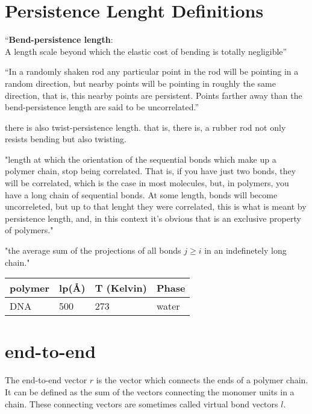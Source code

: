 \section{Persistence Lenght Definitions}

``\textbf{Bend-persistence length}:\\ 
A length scale beyond which the elastic cost of bending is totally
negligible''

``In a randomly shaken rod any particular point in the rod will be
pointing in a random direction, but nearby points will be pointing in
roughly the same direction, that is, this nearby points are
persistent. Points farther away than the bend-persistence length are
said to be uncorrelated.''

there is also twist-persistence length.
that is, there is, a rubber rod not only resists bending but also twisting.

"length at which the orientation of the sequential bonds which make
up a polymer chain, stop being correlated. That is, if you have just
two bonds, they will be correlated, which is the case in most
molecules, but, in polymers, you have a long chain of sequential
bonds. At some length, bonds will become uncorreleted, but up to that
lenght they were correlated, this is what is meant by persistence
length, and, in this context it's obvious that is an exclusive
property of polymers."

"the average sum of the projections of all bonds $ j \geq i$  in an 
indefinetely long chain."


\begin{table}[htbp]
\begin{center}
\begin{tabular}{|l|l|l|l|}
\hline 
polymer & lp(\AA) & T (Kelvin) & Phase \\ \hline
DNA     & 500     &  273       & water \\ \hline
\end{tabular}
\end{center}
\end{table}



\section{end-to-end}
The end-to-end vector  $r$ is the vector which connects  the ends of a 
polymer chain.  It  can be defined  as the sum  of the vectors connecting the
monomer units in a chain. These connecting vectors are sometimes called
virtual  bond vectors $l$.  

